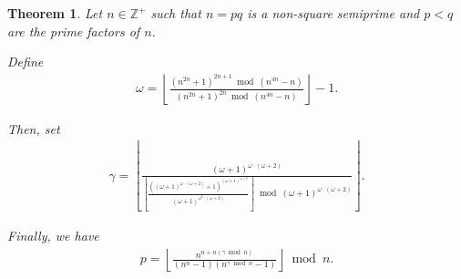 \documentclass{article}
\theoremstyle{plain}
\newtheorem{theorem}{Theorem}
\theoremstyle{definition}
\newcommand{\floor}[1]{\left\lfloor #1 \right\rfloor}
\begin{document}
\begin{theorem} \label{proof:semiprimefactorp1}
Let $n \in \mathbb{Z}^+$ such that $n = p q$ is a non-square semiprime and $p < q$ are the prime factors of $n$.

Define
\begin{align*}
\omega = \floor{\frac{(n^{2n} + 1)^{2n+1} \bmod (n^{4n}-n)}{(n^{2n} + 1)^{2n} \bmod (n^{4n}-n)}} - 1 .
\end{align*}

Then, set
\begin{align*}
\gamma = \floor
{
    \frac
    {
        (\omega+1)^{\omega\cdot(\omega+2)}
    }
    {
        \floor
        {
            \frac
            {
            \left( (\omega+1)^{\omega\cdot(\omega+2)} + 1 \right)^{(\omega+1)^{\omega+2}}
            }
            {
            (\omega+1)^{\omega^2\cdot(\omega+2)}
            }
        }
        \bmod (\omega+1)^{\omega\cdot(\omega+2)}
    }
} .
\end{align*}

Finally, we have
\begin{align*}
p = \floor{\frac{n^{n+n(\gamma \bmod n)}}{(n^n-1)(n^{\gamma \bmod n}-1)}}\bmod n .
\end{align*}
\end{theorem}
\end{document}

